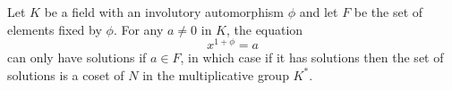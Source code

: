 Let $K$ be a field with an involutory automorphism $\phi$ and let $F$ be the set of elements fixed by $\phi$. For any $a \neq 0$ in $K$, the equation
$$x^{1+\phi} = a$$
can only have solutions if $a \in F$, in which case if it has solutions then the set of solutions is a coset of $N$ in the multiplicative group $K^*$.
